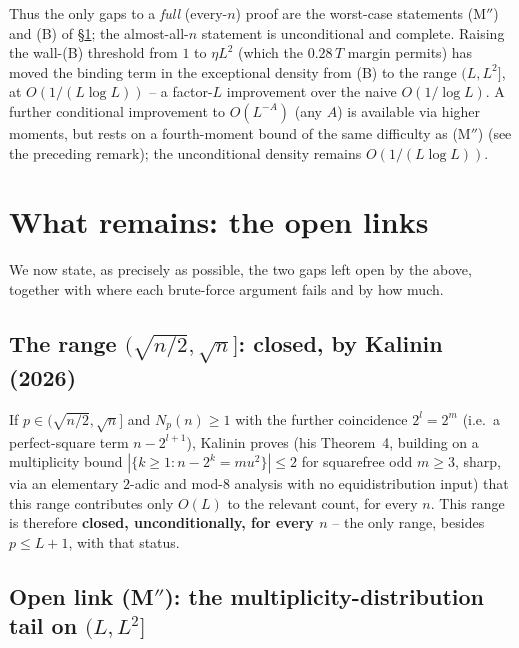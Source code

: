 \documentclass[11pt]{article}
\theoremstyle{plain}
\theoremstyle{definition}
\theoremstyle{remark}
\begin{document}
Thus the only gaps to a \emph{full} (every-$n$) proof are the worst-case
statements (M$''$) and (B) of \S\ref{sec:open}; the almost-all-$n$ statement
is unconditional and complete. Raising the wall-(B) threshold from $1$ to
$\eta L^2$ (which the $0.28\,T$ margin permits) has moved the binding term in
the exceptional density from (B) to the range $(L,L^2]$, at $O(1/(L\log L))$ --
a factor-$L$ improvement over the naive $O(1/\log L)$. A further conditional
improvement to $O(L^{-A})$ (any $A$) is available via higher moments, but rests on
a fourth-moment bound of the same difficulty as (M$''$) (see the preceding
remark); the unconditional density remains $O(1/(L\log L))$.

\section{What remains: the open links}\label{sec:open}

We now state, as precisely as possible, the two gaps left open by the above,
together with where each brute-force argument fails and by how much.

\subsection{The range $(\sqrt{n/2},\sqrt n]$: closed, by Kalinin (2026)}

If $p\in(\sqrt{n/2},\sqrt n]$ and $N_p(n)\ge1$ with the further coincidence
$2^l=2^m$ (i.e.\ a perfect-square term $n-2^{l+1}$), Kalinin
\cite{Kalinin2026} proves (his Theorem~4, building on a multiplicity bound
$|\{k\ge1:n-2^k=mu^2\}|\le2$ for squarefree odd $m\ge3$, sharp, via an
elementary $2$-adic and mod-$8$ analysis with no equidistribution input) that
this range contributes only $O(L)$ to the relevant count, for every $n$.
This range is therefore \textbf{closed, unconditionally, for every $n$} --
the only range, besides $p\le L+1$, with that status.

\subsection{Open link (M$''$): the multiplicity-distribution tail on $(L,L^2]$}
\end{document}
